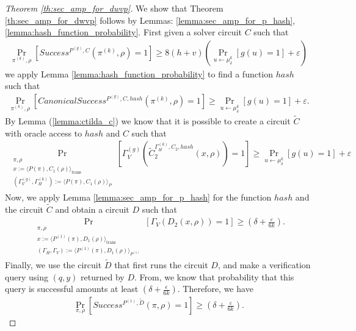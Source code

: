 \begin{proof}[Theorem \ref{th:sec_amp_for_dwvp}]
We show that Theorem \ref{th:sec_amp_for_dwvp} follows by Lemmas: \ref{lemma:sec_amp_for_p_hash}, \ref{lemma:hash_function_probability}.
First given a solver circuit $C$ such that
\begin{align*}
    \underset{\pi^{(k)}, \rho}{\Pr}\left[Success^{P^{(g)}, C}(\pi^{(k)}, \rho) = 1\right] \geq 8(h+v)\left(\underset{u \leftarrow \mu_\delta^k}{\Pr}\left[g(u) = 1\right] + \varepsilon\right)
\end{align*}
we apply Lemma \ref{lemma:hash_function_probability} to find a function $hash$ such that
\begin{align*}
    \underset{\pi^{(k)}, \rho}{\Pr}\left[CanonicalSuccess^{P^{(g)}, C, hash}(\pi^{(k)}, \rho) = 1\right] \geq \underset{u \leftarrow \mu_\delta^k}{\Pr}\left[g(u) = 1\right] + \varepsilon.
\end{align*}
By Lemma (\ref{lemma:ctilda_c}) we know that it is possible to create a circuit $\widetilde{C}$ with oracle access to $hash$ and $C$ such that
\begin{align*}
    \underset{\substack{\pi, \rho \\
        x := \langle P(\pi), C_1(\rho) \rangle_{\text{trans}} \\
        (\Gamma_V^{(g)}, \Gamma_H^{(k)}) := \langle P(\pi), C_1(\rho) \rangle_{P}
      }}
    {\Pr}[\Gamma_V^{(g)}(\widetilde{C}_2^{\Gamma_H^{(k)}, C_2, hash}(x, \rho)) = 1]
    \geq
\underset{u \leftarrow \mu_\delta^k}{\Pr}\left[g(u) = 1\right] + \varepsilon
\end{align*}
Now, we apply Lemma \ref{lemma:sec_amp_for_p_hash} for the function $hash$ and the circuit $\widetilde{C}$ and obtain a circuit $D$ such that
\begin{align}
  \label{eq:succ_prob_d}
    \underset{\substack{\pi, \rho \\ x := \langle P^{(1)}(\pi), D_1(\rho) \rangle_{\text{trans}} \\
        (\Gamma_H, \Gamma_V) := \langle P^{(1)}(\pi), D_1(\rho) \rangle_{P^{(1)}}}}
    {\Pr}[\Gamma_V(D_2(x, \rho)) = 1] \geq (\delta + \frac{\varepsilon}{6k}).
\end{align}
Finally, we use the circuit $\widetilde{D}$ that first runs the circuit $D$, and make a verification
query using $(q,y)$ returned by $D$. From, we know that probability that this query is successful amounts at least $(\delta + \frac{\epsilon}{6k})$.
Therefore, we have
\begin{align*}
    \underset{\pi, \rho}{\Pr}\left[Success^{P^{(1)},\widetilde{D}}(\pi, \rho) = 1\right] \geq (\delta + \frac{\varepsilon}{6k}).
\end{align*}
\end{proof}

